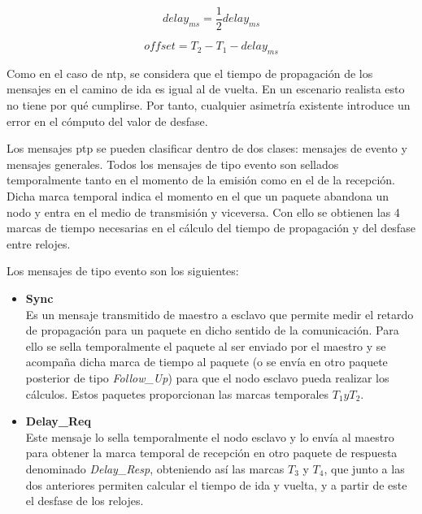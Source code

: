 \begin{equation}\label{delms}
	delay_{ms} = \frac {1} {2} delay_{ms}
\end{equation}

\begin{equation}\label{offset}
	offset = T_2 - T_1 - delay_{ms}
\end{equation}

Como en el caso de \gls{ntp}, se considera que el tiempo de propagación de los 
mensajes en el camino de ida es igual al de vuelta. En un escenario realista 
esto no tiene por qué cumplirse. Por tanto, cualquier asimetría existente 
introduce un error en el cómputo del valor de desfase.

Los mensajes \gls{ptp} se pueden clasificar dentro de dos clases: mensajes de 
evento y mensajes generales. Todos los mensajes de tipo evento son sellados 
temporalmente tanto en el momento de la emisión como en el de la recepción. 
Dicha marca temporal indica el momento en el que un paquete abandona un nodo y 
entra en el medio de transmisión y viceversa. Con ello se obtienen las 4 
marcas de tiempo necesarias en el cálculo del tiempo de propagación y del 
desfase entre relojes.

Los mensajes de tipo evento son los siguientes:


\begin{itemize}
	
	\item \textbf{Sync} \\
	Es un mensaje transmitido de maestro a esclavo que permite medir el retardo 
	de propagación para un paquete en dicho sentido de la comunicación. Para 
	ello 
	se sella temporalmente el paquete al ser enviado por el maestro y se 
	acompaña dicha marca de tiempo al paquete (o se envía en otro paquete 
	posterior de tipo \textit{Follow\_Up}) para que el nodo esclavo pueda 
	realizar los cálculos. Estos paquetes proporcionan las marcas temporales 
	$T_1 y T_2$.
	
	\item \textbf{Delay\_Req} \\
	Este mensaje lo sella temporalmente el nodo esclavo y lo envía al maestro 
	para obtener la marca temporal de recepción en otro paquete de respuesta 
	denominado \textit{Delay\_Resp}, obteniendo así las marcas $T_3$ y $T_4$, 
	que 
	junto a las dos anteriores permiten calcular el tiempo de ida y vuelta, y a 
	partir de este el desfase de los relojes.
\end{itemize}

